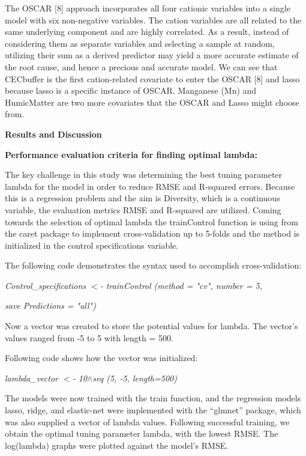 \documentclass{article} %
\begin{document}
\noindent The OSCAR [8] approach incorporates all four cationic variables into a single model with six non-negative variables. The cation variables are all related to the same underlying component and are highly correlated. As a result, instead of considering them as separate variables and selecting a sample at random, utilizing their sum as a derived predictor may yield a more accurate estimate of the root cause, and hence a precious and accurate model. We can see that CECbuffer is the first cation-related covariate to enter the OSCAR [8] and lasso because lasso is a specific instance of OSCAR. Manganese (Mn) and HumicMatter are two more covariates that the OSCAR and Lasso might choose from.

\noindent \textbf{}

\noindent \textbf{Results and Discussion}

\noindent \textbf{Performance evaluation criteria for finding optimal lambda:}

\noindent The key challenge in this study was determining the best tuning parameter lambda for the model in order to reduce RMSE and R-squared errors. Because this is a regression problem and the aim is Diversity, which is a continuous variable, the evaluation metrics RMSE and R-squared are utilized. Coming towards the selection of optimal lambda the trainControl function is using from the caret package to implement cross-validation up to 5-folds and the method is initialized in the control specifications variable.

\noindent The following code demonstrates the syntax used to accomplish cross-validation:

\noindent \textit{Control\_specifications $<$- trainControl (method = "cv", number = 5,}

\noindent \textit{save Predictions = "all")}

\noindent Now a vector was created to store the potential values for lambda. The vector's values ranged from -5 to 5 with length = 500. 

\noindent Following code shows how the vector was initialized:

\noindent \textit{lambda\_vector $<$- 10$\wedge$seq (5, -5, length=500)}

\noindent The models were now trained with the train function, and the regression models lasso, ridge, and elastic-net were implemented with the ``glmnet'' package, which was also supplied a vector of lambda values. Following successful training, we obtain the optimal tuning parameter lambda, with the lowest RMSE. The log(lambda) graphs were plotted against the model's RMSE.
\end{document}

